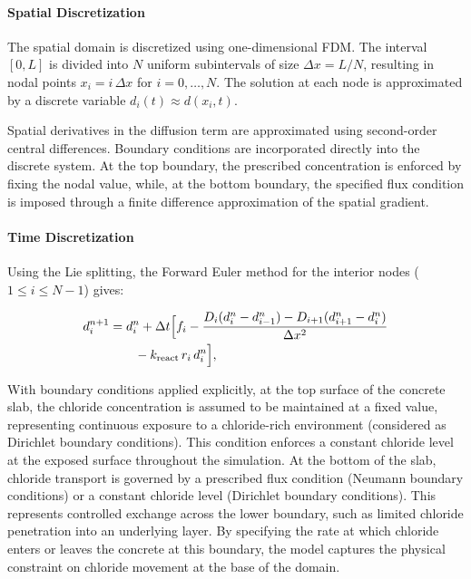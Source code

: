 \documentclass[conference]{IEEEtran}
\begin{document}
 \paragraph{Spatial Discretization}

The spatial domain is discretized using one-dimensional FDM. The interval $[0,L]$ is divided into $N$ uniform subintervals of size $\Delta x = L/N$, resulting in nodal points $x_i = i\,\Delta x$ for $i = 0,\dots,N$. 
The solution at each node is approximated by a discrete variable $d_i(t) \approx d(x_i,t)$.

Spatial derivatives in the diffusion term are approximated using second-order central differences.
Boundary conditions are incorporated directly into the discrete system. At the top boundary, the prescribed concentration is enforced by fixing the nodal value, while, at the bottom boundary, the specified flux condition is imposed through a finite difference approximation of the spatial gradient. 

\paragraph{Time Discretization}

Using the Lie splitting, the Forward Euler method for the interior nodes ($1 \le i \le N-1$) gives:


\begin{equation}
\begin{aligned}
d_i^{n+1} 
&= d_i^n 
+ \Delta t \Bigl[
f_i
-
\frac{
D_i (d_i^n - d_{i-1}^n)
-
D_{i+1} (d_{i+1}^n - d_i^n)
}{\Delta x^2}
\\
&\qquad
-
k_{\mathrm{react}}\, r_i\, d_i^n
\Bigr], 
\end{aligned}
\label{eq:forward_euler_interior}
\end{equation}



With boundary conditions applied explicitly,
at the top surface of the concrete slab, the chloride concentration is assumed to be maintained at a fixed value, representing continuous exposure to a chloride-rich environment (considered as Dirichlet boundary conditions). This condition enforces a constant chloride level at the exposed surface throughout the simulation.
At the bottom of the slab, chloride transport is governed by a prescribed flux condition (Neumann boundary conditions) or a constant chloride level (Dirichlet boundary conditions). This represents controlled exchange across the lower boundary, such as limited chloride penetration into an underlying layer. By specifying the rate at which chloride enters or leaves the concrete at this boundary, the model captures the physical constraint on chloride movement at the base of the domain.
\end{document}
